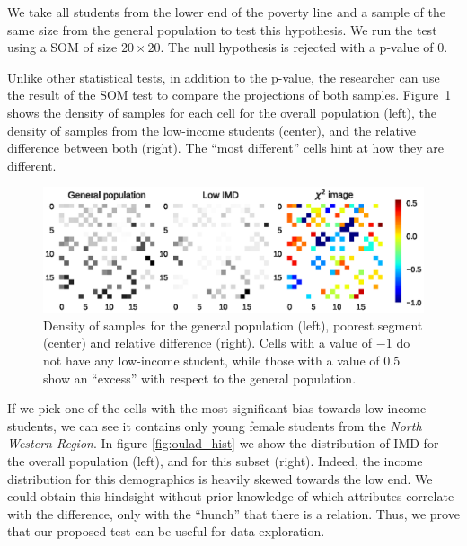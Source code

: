 We take all students from the lower end of the poverty line and a sample of the same size
from the general population to test this hypothesis. We run the test using a \gls{SOM}  of size
$20\times20$. The null hypothesis is rejected with a p-value of $0$.

Unlike other statistical tests, in addition to the p-value, the researcher can use
the result of the \gls{SOM}  test to compare the projections of both samples.
Figure~\ref{fig:oulad_grid} shows the density of samples for each cell for the overall population
(left), the density of samples from the low-income students (center), and the relative difference
between both (right). The ``most different'' cells hint at how they are different.

\begin{figure}[t]
    \centering
    \includegraphics[width=\textwidth]{images/6_som/imd.eps}
    \caption[Comparing \gls{SOM} density variations]{Density of samples for the general population (left), poorest segment (center) and
    relative difference (right). Cells with a value of $-1$ do not have any low-income student,
    while those with a value of $0.5$ show an ``excess'' with respect to the general
    population.}
    \label{fig:oulad_grid}
\end{figure}

If we pick one of the cells with the most significant bias towards low-income students,
we can see it contains only young female students from the \emph{North Western Region}.
In figure \ref{fig:oulad_hist} we show the distribution of IMD for the overall population (left),
and for this subset (right). Indeed, the income distribution for this demographics is
heavily skewed towards the low end. We could obtain this hindsight without prior knowledge of which
attributes correlate with the difference, only with the ``hunch'' that
there is a relation. Thus, we prove that our proposed test can be useful for data exploration.

